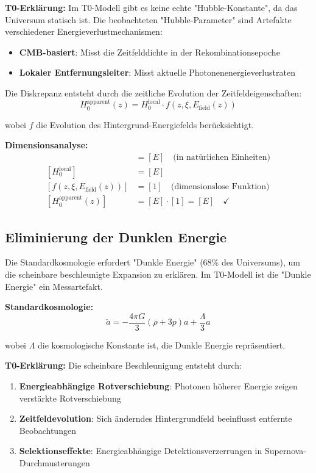 \documentclass[12pt,a4paper]{report}
\begin{document}
	\textbf{T0-Erklärung:}
	Im T0-Modell gibt es keine echte "Hubble-Konstante", da das Universum statisch ist. Die beobachteten "Hubble-Parameter" sind Artefakte verschiedener Energieverlustmechanismen:
	
	\begin{itemize}
		\item \textbf{CMB-basiert}: Misst die Zeitfelddichte in der Rekombinationsepoche
		\item \textbf{Lokaler Entfernungsleiter}: Misst aktuelle Photonenenergieverlustraten
	\end{itemize}
	
	Die Diskrepanz entsteht durch die zeitliche Evolution der Zeitfeldeigenschaften:
	\begin{equation}
		H_0^{\text{apparent}}(z) = H_0^{\text{local}} \cdot f(z, \xi, E_{\text{field}}(z))
	\end{equation}
	
	wobei $f$ die Evolution des Hintergrund-Energiefelds berücksichtigt.
	
	\textbf{Dimensionsanalyse:}
	\begin{align}
		[H_0^{\text{apparent}}(z)] &= [E] \quad \text{(in natürlichen Einheiten)} \\
		[H_0^{\text{local}}] &= [E] \\
		[f(z, \xi, E_{\text{field}}(z))] &= [1] \quad \text{(dimensionslose Funktion)} \\
		[H_0^{\text{apparent}}(z)] &= [E] \cdot [1] = [E] \quad \checkmark
	\end{align}
	
	\subsection{Eliminierung der Dunklen Energie}
	\label{subsec:dark_energy_elimination}
	
	Die Standardkosmologie erfordert "Dunkle Energie" (68\% des Universums), um die scheinbare beschleunigte Expansion zu erklären. Im T0-Modell ist die "Dunkle Energie" ein Messartefakt.
	
	\textbf{Standardkosmologie:}
	\begin{equation}
		\ddot{a} = -\frac{4\pi G}{3}(\rho + 3p)a + \frac{\Lambda}{3}a
	\end{equation}
	
	wobei $\Lambda$ die kosmologische Konstante ist, die Dunkle Energie repräsentiert.
	
	\textbf{T0-Erklärung:}
	Die scheinbare Beschleunigung entsteht durch:
	\begin{enumerate}
		\item \textbf{Energieabhängige Rotverschiebung}: Photonen höherer Energie zeigen verstärkte Rotverschiebung
		\item \textbf{Zeitfeldevolution}: Sich änderndes Hintergrundfeld beeinflusst entfernte Beobachtungen
		\item \textbf{Selektionseffekte}: Energieabhängige Detektionsverzerrungen in Supernova-Durchmusterungen
	\end{enumerate}
	
\end{document}
